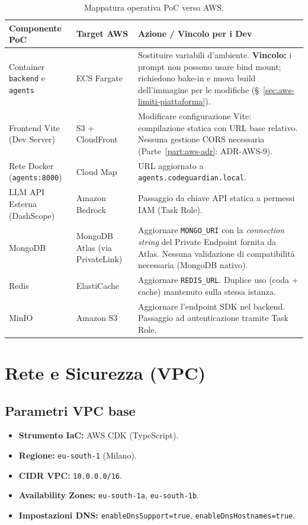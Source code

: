 \documentclass[11pt,a4paper]{article}
\begin{document}
\begin{table}[H]
\centering
\caption{Mappatura operativa PoC verso AWS.}
\label{tab:aws-mappatura}
\vspace{2mm}
\renewcommand{\arraystretch}{1.2}
\begin{tabularx}{\textwidth}{|X|X|X|}
\hline
\textbf{Componente PoC} & \textbf{Target AWS} & \textbf{Azione / Vincolo per i Dev} \\ \hline
Container \texttt{backend} e \texttt{agents} & ECS Fargate & Sostituire variabili d'ambiente. \textbf{Vincolo:} i prompt non possono usare bind mount; richiedono bake-in e nuova build dell'immagine per le modifiche (\S~\ref{sec:aws-limiti-piattaforma}). \\ \hline
Frontend Vite (Dev Server) & S3 + CloudFront & Modificare configurazione Vite: compilazione statica con URL base relativo. Nessuna gestione CORS necessaria (Parte~\ref{part:aws-adr}: ADR-AWS-9). \\ \hline
Rete Docker (\texttt{agents:8000}) & Cloud Map & URL aggiornato a \texttt{agents.codeguardian.local}. \\ \hline
LLM API Esterna (DashScope) & Amazon Bedrock & Passaggio da chiave API statica a permessi IAM (Task Role). \\ \hline
MongoDB & MongoDB Atlas (via PrivateLink) & Aggiornare \texttt{MONGO\_URI} con la \emph{connection string} del Private Endpoint fornita da Atlas. Nessuna validazione di compatibilità necessaria (MongoDB nativo). \\ \hline
Redis & ElastiCache & Aggiornare \texttt{REDIS\_URL}. Duplice uso (coda + cache) mantenuto sulla stessa istanza. \\ \hline
MinIO & Amazon S3 & Aggiornare l'endpoint SDK nel backend. Passaggio ad autenticazione tramite Task Role. \\ \hline
\end{tabularx}
\end{table}

\section{Rete e Sicurezza (VPC)}

\subsection{Parametri VPC base}

\begin{itemize}
    \item \textbf{Strumento IaC:} AWS CDK (TypeScript).
    \item \textbf{Regione:} \texttt{eu-south-1} (Milano).
    \item \textbf{CIDR VPC:} \texttt{10.0.0.0/16}.
    \item \textbf{Availability Zones:} \texttt{eu-south-1a}, \texttt{eu-south-1b}.
    \item \textbf{Impostazioni DNS:} \texttt{enableDnsSupport=true}, \texttt{enableDnsHostnames=true}.
\end{itemize}
\end{document}
